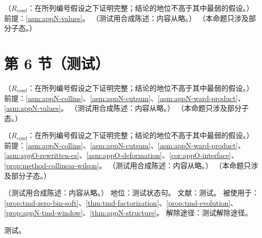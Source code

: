 \begin{proposition}\label{prop:appN-thrust-zerobin}
（$R_{\mathrm{cond}}$：在所列编号假设之下证明完整；结论的地位不高于其中最弱的假设。）
前提：\cref{asm:appN-values}。
（测试用合成陈述：内容从略。）
（本命题只涉及部分子态。）
\end{proposition}

\section{第 6 节（测试）}\label{sec:appN-exclusive}

\begin{proposition}\label{prop:appN-thrust}
（$R_{\mathrm{cond}}$：在所列编号假设之下证明完整；结论的地位不高于其中最弱的假设。）
前提：\cref{asm:appN-collins}、\cref{asm:appN-cutsum}、\cref{asm:appN-ward-product}、\cref{asm:appN-values}。
（测试用合成陈述：内容从略。）
（本命题只涉及部分子态。）
\end{proposition}

\begin{proposition}\label{prop:appN-dy}
（$R_{\mathrm{cond}}$：在所列编号假设之下证明完整；结论的地位不高于其中最弱的假设。）
前提：\cref{asm:appN-collins}、\cref{asm:appN-cutsum}、\cref{asm:appN-ward-product}、\cref{asm:appO-rewritten-cs}、\cref{asm:appO-deformation}、\cref{cor:appO-interface}、\cref{prop:method-collinear-wilson}。
（测试用合成陈述：内容从略。）
（本命题只涉及部分子态。）
\end{proposition}

\begin{assumption}\label{asm:appN-tmd}
（测试用合成陈述：内容从略。）
地位：测试状态句。
文献：测试。
被使用于：\cref{prop:tmd-zero-bin-soft}、\cref{thm:tmd-factorization}、\cref{prop:tmd-evolution}、\cref{prop:appN-tmd-window}、\cref{thm:appN-structure}。
解除途径：测试解除途径。
\end{assumption}
\begin{proofsketch}测试。\end{proofsketch}

